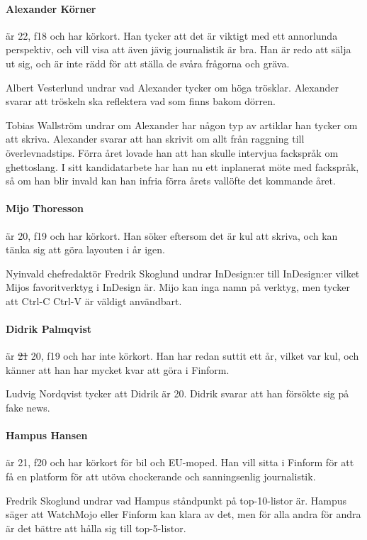 \documentclass[hidelinks]{sektionsmote}
\begin{document}
\paragraph{Alexander Körner} är 22, f18 och har körkort.
Han tycker att det är viktigt med ett annorlunda perspektiv, och vill visa att även jävig journalistik är bra.
Han är redo att sälja ut sig, och är inte rädd för att ställa de svåra frågorna och gräva.

Albert Vesterlund undrar vad Alexander tycker om höga trösklar.
Alexander svarar att tröskeln ska reflektera vad som finns bakom dörren.

Tobias Wallström undrar om Alexander har någon typ av artiklar han tycker om att skriva.
Alexander svarar att han skrivit om allt från raggning till överlevnadstips.
Förra året lovade han att han skulle intervjua fackspråk om ghettoslang.
I sitt kandidatarbete har han nu ett inplanerat möte med fackspråk, så om han blir invald kan han infria förra årets vallöfte det kommande året.

\paragraph{Mijo Thoresson} är 20, f19 och har körkort.
Han söker eftersom det är kul att skriva, och kan tänka sig att göra layouten i år igen.

Nyinvald chefredaktör Fredrik Skoglund undrar InDesign:er till InDesign:er vilket Mijos favoritverktyg i InDesign är.
Mijo kan inga namn på verktyg, men tycker att Ctrl-C Ctrl-V är väldigt användbart.

\paragraph{Didrik Palmqvist} är \st{21} 20, f19 och har inte körkort.
Han har redan suttit ett år, vilket var kul, och känner att han har mycket kvar att göra i Finform.

Ludvig Nordqvist tycker att Didrik är 20.
Didrik svarar att han försökte sig på fake news.

\paragraph{Hampus Hansen} är 21, f20 och har körkort för bil och EU-moped.
Han vill sitta i Finform för att få en platform för att utöva chockerande och sanningsenlig journalistik.

Fredrik Skoglund undrar vad Hampus ståndpunkt på top-10-listor är.
Hampus säger att WatchMojo eller Finform kan klara av det, men för alla andra för andra är det bättre att hålla sig till top-5-listor.
\end{document}
